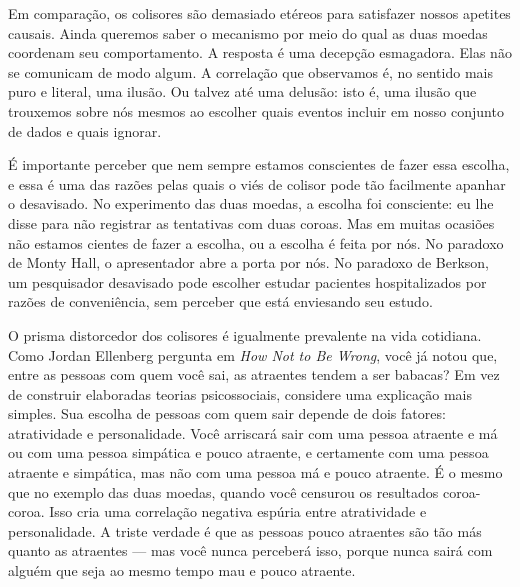 \documentclass[11pt,a5paper,twoside]{book}
\begin{document}
Em comparação, os colisores são demasiado etéreos para satisfazer nossos apetites causais. Ainda queremos saber o mecanismo por meio do qual as duas moedas coordenam seu comportamento. A resposta é uma decepção esmagadora. Elas não se comunicam de modo algum. A correlação que observamos é, no sentido mais puro e literal, uma ilusão. Ou talvez até uma delusão: isto é, uma ilusão que trouxemos sobre nós mesmos ao escolher quais eventos incluir em nosso conjunto de dados e quais ignorar.

É importante perceber que nem sempre estamos conscientes de fazer essa escolha, e essa é uma das razões pelas quais o viés de colisor pode tão facilmente apanhar o desavisado. No experimento das duas moedas, a escolha foi consciente: eu lhe disse para não registrar as tentativas com duas coroas. Mas em muitas ocasiões não estamos cientes de fazer a escolha, ou a escolha é feita por nós. No paradoxo de Monty Hall, o apresentador abre a porta por nós. No paradoxo de Berkson, um pesquisador desavisado pode escolher estudar pacientes hospitalizados por razões de conveniência, sem perceber que está enviesando seu estudo.

O prisma distorcedor dos colisores é igualmente prevalente na vida cotidiana. Como Jordan Ellenberg pergunta em \textit{How Not to Be Wrong}, você já notou que, entre as pessoas com quem você sai, as atraentes tendem a ser babacas? Em vez de construir elaboradas teorias psicossociais, considere uma explicação mais simples. Sua escolha de pessoas com quem sair depende de dois fatores: atratividade e personalidade. Você arriscará sair com uma pessoa atraente e má ou com uma pessoa simpática e pouco atraente, e certamente com uma pessoa atraente e simpática, mas não com uma pessoa má e pouco atraente. É o mesmo que no exemplo das duas moedas, quando você censurou os resultados coroa-coroa. Isso cria uma correlação negativa espúria entre atratividade e personalidade. A triste verdade é que as pessoas pouco atraentes são tão más quanto as atraentes — mas você nunca perceberá isso, porque nunca sairá com alguém que seja ao mesmo tempo mau e pouco atraente.
\end{document}
